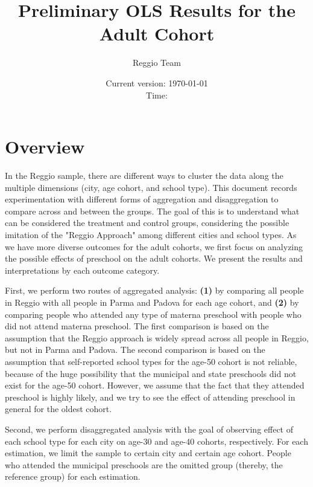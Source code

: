 



\title{Preliminary OLS Results for the Adult Cohort}
\author{Reggio Team}
\date{Current version: \today \\ \vspace{1em} Time: \currenttime}
\maketitle


\doublespacing
\listoftables

\section{Overview}

In the Reggio sample, there are different ways to cluster the data along the multiple dimensions (city, age cohort, and school type). This document records experimentation with different forms of aggregation and disaggregation to compare across and between the groups. The goal of this is to understand what can be considered the treatment and control groups, considering the possible imitation of the "Reggio Approach" among different cities and school types. As we have more diverse outcomes for the adult cohorts, we first focus on analyzing the possible effects of preschool on the adult cohorts. We present the results and interpretations by each outcome category.

First, we perform two routes of aggregated analysis: \textbf{(1)} by comparing all people in Reggio with all people in Parma and Padova for each age cohort, and \textbf{(2)} by comparing people who attended any type of materna preschool with people who did not attend materna preschool. The first comparison is based on the assumption that the Reggio approach is widely spread across all people in Reggio, but not in Parma and Padova. The second comparison is based on the assumption that self-reported school types for the age-50 cohort is not reliable, because of the huge possibility that the municipal and state preschools did not exist for the age-50 cohort. However, we assume that the fact that they attended preschool is highly likely, and we try to see the effect of attending preschool in general for the oldest cohort. 

Second, we perform disaggregated analysis with the goal of observing effect of each school type for each city on age-30 and age-40 cohorts, respectively. For each estimation, we limit the sample to certain city and certain age cohort. People who attended the municipal preschools are the omitted group (thereby, the reference group) for each estimation. 

